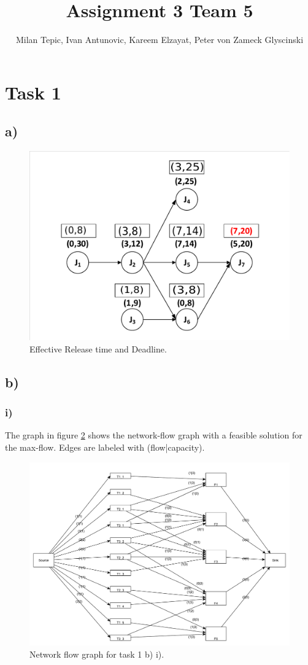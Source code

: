 \documentclass[10pt,a4paper]{article}
\author{Milan Tepic, Ivan Antunovic, Kareem Elzayat, Peter von Zameck Glyscinski}
\title{Assignment 3 Team 5}
\begin{document}
\maketitle
\section*{Task 1}
\subsection*{a)}
\begin{figure}[h]
\includegraphics[width=\linewidth]{1a.pdf}
\caption{Effective Release time and Deadline.} 
\label{fig:1a}
\end{figure}
\newpage
\subsection*{b)}
\subsubsection*{i)}
The graph in figure \ref{fig:1bi} shows the network-flow graph with a feasible solution for the max-flow.
Edges are labeled with (flow|capacity).

\begin{figure}[h]
\includegraphics[width=\linewidth]{maxflow_1b.pdf}
\caption{Network flow graph for task 1 b) i).}
\label{fig:1bi}
\end{figure}
\end{document}
